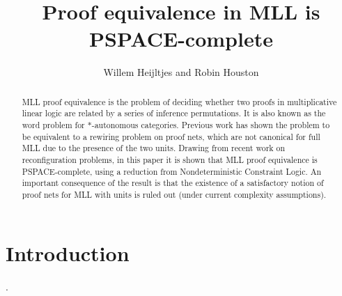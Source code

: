 \documentclass{lmcs}
\title{Proof equivalence in MLL is PSPACE-complete}
\author{Willem Heijltjes and Robin Houston}
\let\capsabbrev=\uppercase
\begin{document}
\maketitle




\begin{abstract}
\capsabbrev{mll} proof equivalence is the problem of deciding whether two proofs in multiplicative linear logic are related by a series of inference permutations.
%
It is also known as the word problem for $*$-autonomous categories.
%
Previous work has shown the problem to be equivalent to a rewiring problem on proof nets, which are not canonical for full \capsabbrev{mll} due to the presence of the two units.
%
Drawing from recent work on reconfiguration problems, in this paper it is shown that \capsabbrev{mll} proof equivalence is \capsabbrev{pspace}-complete, using a reduction from Nondeterministic Constraint Logic.
%
An important consequence of the result is that the existence of a satisfactory notion of proof nets for \capsabbrev{mll} with units is ruled out (under current complexity assumptions).
\end{abstract}



\section{Introduction}


%

\cite{Lambek-1968}

\cite{Girard-1987,Danos-Regnier-1989}
\cite{Trimble-1994,Blute-Cockett-Seely-Trimble-1996}
\cite{Lamarche-Strassburger-2006}
\cite{HughesFreeStar,HughesMLLProofNets}


\cite{Hughes-vanGlabbeek-2005}
\cite{Heijltjes-2011}

\cite{Demaine-Hearn-2008}

\cite{ReconfigurationProblems}
\cite{Kanovich-1992,Lincoln-Winkler-1994}.
\end{document}
